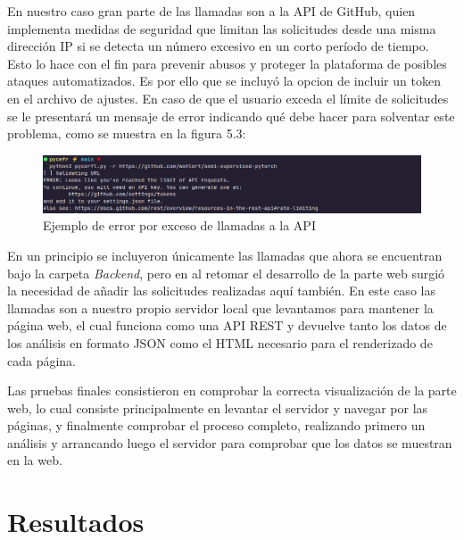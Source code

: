 \documentclass[a4paper, 12pt]{book}
\begin{document}
En nuestro caso gran parte de las llamadas son a la API de GitHub, quien implementa medidas de seguridad que limitan las solicitudes desde una misma dirección IP si se detecta un número excesivo en un corto período de tiempo. Esto lo hace con el fin para prevenir abusos y proteger la plataforma de posibles ataques automatizados. Es por ello que se incluyó la opcion de incluir un token en el archivo de ajustes. En caso de que el usuario exceda el límite de solicitudes se le presentará un mensaje de error indicando qué debe hacer para solventar este problema, como se muestra en la figura 5.3: 

\vspace{1em}
\begin{figure}[H]
    \centering
    \includegraphics[width=\textwidth]{img/results/backend_exe_r_api_error.png}
    \caption{Ejemplo de error por exceso de llamadas a la API}
    \label{fig:api_limit}
\end{figure}
\vspace{1em}

En un principio se incluyeron únicamente las llamadas que ahora se encuentran bajo la carpeta \textit{Backend}, pero en al retomar el desarrollo de la parte web surgió la necesidad de añadir las solicitudes realizadas aquí también. En este caso las llamadas son a nuestro propio servidor local que levantamos para mantener la página web, el cual funciona como una API REST y devuelve tanto los datos de los análisis en formato JSON como el HTML necesario para el renderizado de cada página.

Las pruebas finales consistieron en comprobar la correcta visualización de la parte web, lo cual consiste principalmente en levantar el servidor y navegar por las páginas, y finalmente comprobar el proceso completo, realizando primero un análisis y arrancando luego el servidor para comprobar que los datos se muestran en la web.


\cleardoublepage
\chapter{Resultados}
\label{chap:resultados}
\end{document}

